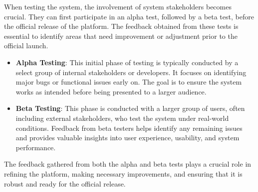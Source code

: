 When testing the system, the involvement of system stakeholders becomes crucial. They can first participate in an alpha test, followed by a beta test, before the official release of the platform. The feedback obtained from these tests is essential to identify areas that need improvement or adjustment prior to the official launch.
\begin{itemize}
	\item \textbf{Alpha Testing}: This initial phase of testing is typically conducted by a select group of internal stakeholders or developers. It focuses on identifying major bugs or functional issues early on. The goal is to ensure the system works as intended before being presented to a larger audience.
	\item \textbf{Beta Testing}: This phase is conducted with a larger group of users, often including external stakeholders, who test the system under real-world conditions. Feedback from beta testers helps identify any remaining issues and provides valuable insights into user experience, usability, and system performance.
\end{itemize}	

The feedback gathered from both the alpha and beta tests plays a crucial role in refining the platform, making necessary improvements, and ensuring that it is robust and ready for the official release.
